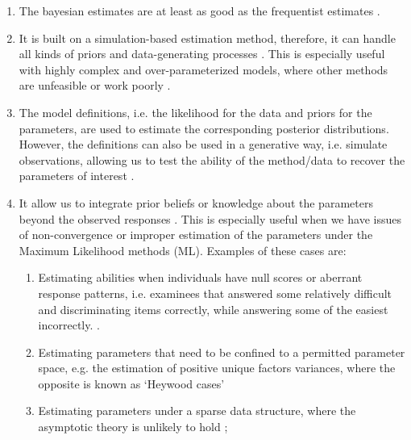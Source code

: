 \begin{enumerate}
	\item The bayesian estimates are at least as good as the frequentist estimates \cite{Baker_1998, Wollack_2002, Hsieh_2010}. 
	
	\item It is built on a simulation-based estimation method, therefore, it can handle all kinds of priors and data-generating processes \cite{Fox_2010}. This is especially useful with highly complex and over-parameterized models, where other methods are unfeasible or work poorly \cite{Baker_1998, Kim_1999}. 
	
	\item The model definitions, i.e. the likelihood for the data and priors for the parameters, are used to estimate the corresponding posterior distributions. However, the definitions can also be used in a generative way, i.e. simulate observations, allowing us to test the ability of the method/data to recover the parameters of interest \cite{McElreath_2020}.
	
	\item It allow us to integrate prior beliefs or knowledge about the parameters beyond the observed responses \cite{Fox_2010, Skrondal_et_al_2004a}. This is especially useful when we have issues of non-convergence or improper estimation of the parameters under the Maximum Likelihood methods (ML). Examples of these cases are:
	
	\begin{enumerate}
		\item Estimating abilities when individuals have null scores or aberrant response patterns, i.e. examinees that answered some relatively difficult and discriminating items correctly, while answering some of the easiest incorrectly. \cite{Hambleton_et_al_1991a, Azevedo_2003}.
		
		\item Estimating parameters that need to be confined to a permitted parameter space, e.g. the estimation of positive unique factors variances, where the opposite is known as ‘Heywood cases’ \cite{Martin_et_al_1975}
		
		\item Estimating parameters under a sparse data structure, where the asymptotic theory is unlikely to hold \cite{Fox_2010};
		
	\end{enumerate}
	
\end{enumerate}

